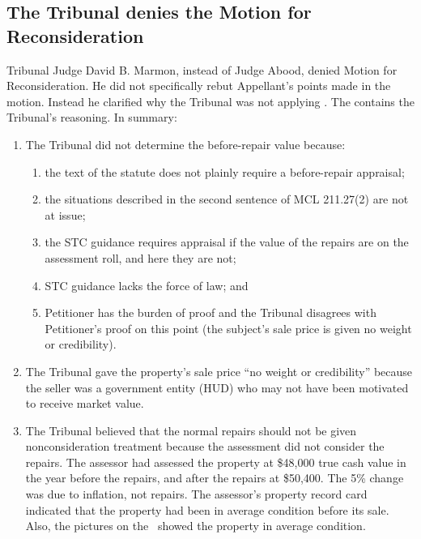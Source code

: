 \documentclass[12pt,\documentclassflag]{michiganCourtOfAppealsBrief}
\begin{document}
\subsection{The Tribunal denies the Motion for Reconsideration}

Tribunal Judge David B. Marmon, instead of Judge Abood, denied Motion for Reconsideration. He did not specifically rebut Appellant's points made in the motion. Instead he clarified why the Tribunal was not applying \mathieuGast. The \reconsiderationDenied[2] contains the Tribunal's reasoning. In summary:

\begin{enumerate}
  
\item The Tribunal did not determine the before-repair value because:
  \begin{enumerate}
  \item the text of the statute does not plainly require a before-repair appraisal;
  \item the situations described in the second sentence of MCL 211.27(2) are not at issue;
  \item the STC guidance requires appraisal if the value of the repairs are on the assessment roll, and here they are not;
  \item STC guidance lacks the force of law; and
  \item Petitioner has the burden of proof and the Tribunal disagrees with Petitioner's proof on this point (the subject's sale price is given no weight or credibility).
  \end{enumerate}
  
\item The Tribunal gave the property's sale price ``no weight or credibility'' because the seller was a government entity (HUD) who may not have been motivated to receive market value.
  
\item The Tribunal believed that the normal repairs should not be given nonconsideration treatment because the assessment did not consider the repairs. The assessor had assessed the property at \$48,000 true cash value in the year before the repairs, and after the repairs at \$50,400. The 5\% change was due to inflation, not repairs. The assessor's property record card indicated that the property had been in average condition before its sale. Also, the pictures on the \MLS\ showed the property in average condition.

\end{enumerate}
\end{document}
